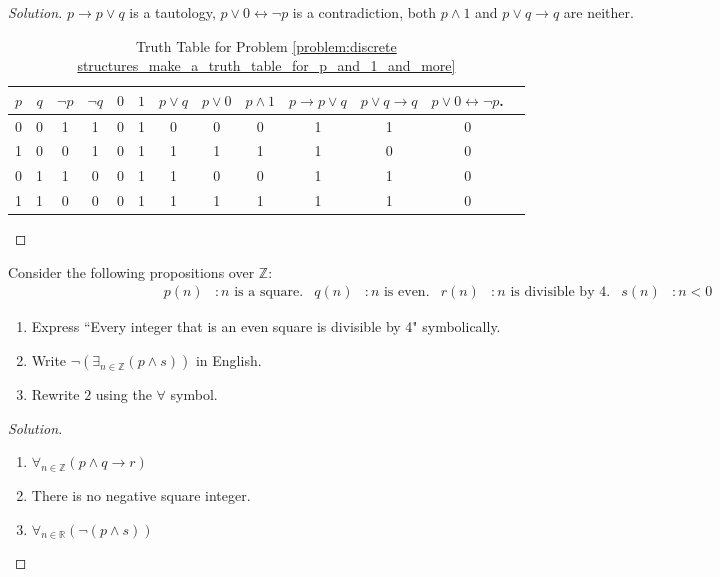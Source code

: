     \begin{proof}[Solution]
    $p\rightarrow p\lor q$ is a tautology, $p\lor 0 \leftrightarrow \neg p$ is a contradiction, both $p\land 1$ and $p\lor q \rightarrow q$ are neither. 
    \begin{table}[H]
        \centering
        \captionsetup{type=table}
        \begin{tabular}{c c c c c c c c c c c c c} 
             \hline 
             $p$ & $q$ & $\neg p$ & $\neg q$ & $0$ & $1$ & $p\lor q$ & $p \lor 0$ & $p\land 1$ & $p\rightarrow p\lor q$ & $p\lor q \rightarrow q$ & $p\lor 0 \leftrightarrow \neg p$.\\ [0.5ex] 
             \hline
             0 & 0 & 1 & 1 & 0 & 1 & 0 & 0 & 0 & 1 & 1 & 0 \\
             1 & 0 & 0 & 1 & 0 & 1 & 1 & 1 & 1 & 1 & 0 & 0 \\
             0 & 1 & 1 & 0 & 0 & 1 & 1 & 0 & 0 & 1 & 1 & 0 \\
             1 & 1 & 0 & 0 & 0 & 1 & 1 & 1 & 1 & 1 & 1 & 0 \\
             \hline
        \end{tabular}
        \caption{Truth Table for Problem \ref{problem:discrete structures_make_a_truth_table_for_p_and_1_and_more}}
    \end{table}
    \end{proof}
    \begin{problem}
    Consider the following propositions over $\mathbb{Z}$:
    \begin{align*}
        p(n)&:n\textrm{ is a square.} & q(n)&:n\textrm{ is even.} & r(n)&:n\textrm{ is divisible by 4.} & s(n)&:n<0
    \end{align*}
    \begin{enumerate}
        \item Express ``Every integer that is an even square is divisible by 4" symbolically.
        \item Write $\neg(\exists_{n\in \mathbb{Z}}(p\land s))$ in English.
        \item Rewrite $2$ using the $\forall$ symbol.
    \end{enumerate}
    \end{problem}
    \begin{proof}[Solution]
    \vspace{-\topsep}
    \
    \begin{enumerate}
        \item $\forall_{n\in \mathbb{Z}}(p\land q \rightarrow r)$
        \item There is no negative square integer.
        \item $\forall_{n\in \mathbb{R}}(\neg(p\land s))$
    \end{enumerate}
    \end{proof}

